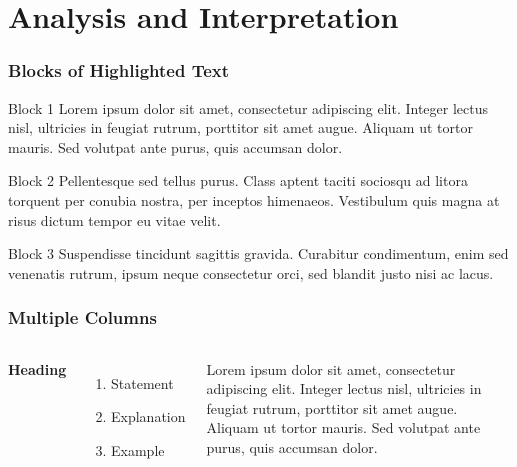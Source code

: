 \documentclass{beamer}
\begin{document}
\section{Analysis and Interpretation} %
\begin{frame}
\frametitle{Blocks of Highlighted Text}
\begin{block}{Block 1}
Lorem ipsum dolor sit amet, consectetur adipiscing elit. Integer lectus nisl, ultricies in feugiat rutrum, porttitor sit amet augue. Aliquam ut tortor mauris. Sed volutpat ante purus, quis accumsan dolor.
\end{block}

\begin{block}{Block 2}
Pellentesque sed tellus purus. Class aptent taciti sociosqu ad litora torquent per conubia nostra, per inceptos himenaeos. Vestibulum quis magna at risus dictum tempor eu vitae velit.
\end{block}

\begin{block}{Block 3}
Suspendisse tincidunt sagittis gravida. Curabitur condimentum, enim sed venenatis rutrum, ipsum neque consectetur orci, sed blandit justo nisi ac lacus.
\end{block}
\end{frame}


\begin{frame}
\frametitle{Multiple Columns}
\begin{columns}[c] %

\textbf{Heading}
\begin{enumerate}
\item Statement
\item Explanation
\item Example
\end{enumerate}

Lorem ipsum dolor sit amet, consectetur adipiscing elit. Integer lectus nisl, ultricies in feugiat rutrum, porttitor sit amet augue. Aliquam ut tortor mauris. Sed volutpat ante purus, quis accumsan dolor.

\end{columns}
\end{frame}
\end{document}
